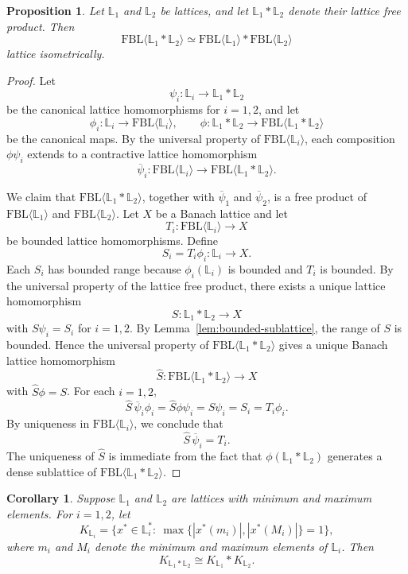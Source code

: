 \documentclass[12pt]{amsart}
\newcommand{\FBL}{\mathrm{FBL}}
\theoremstyle{plain}
\newtheorem{corollary}[theorem]{Corollary}
\newtheorem{proposition}[theorem]{Proposition}
\theoremstyle{definition}
\begin{document}
\begin{proposition}\label{prop:lattice-freeproducts}
Let $\mathbb L_1$ and $\mathbb L_2$ be lattices, and let $\mathbb L_1\ast \mathbb L_2$ denote their lattice free product. Then
\[
\FBL\langle \mathbb L_1\ast \mathbb L_2\rangle
\simeq
\FBL\langle \mathbb L_1\rangle\ast \FBL\langle \mathbb L_2\rangle
\]
lattice isometrically.
\end{proposition}

\begin{proof}
Let
\[
\psi_i:{\mathbb L}_i\to \mathbb L_1\ast \mathbb L_2
\]
be the canonical lattice homomorphisms for $i=1,2$, and let
\[
\phi_i:{\mathbb L}_i\to \FBL\langle \mathbb L_i\rangle,
\qquad
\phi:{\mathbb L}_1\ast \mathbb L_2\to \FBL\langle \mathbb L_1\ast \mathbb L_2\rangle
\]
be the canonical maps. By the universal property of $\FBL\langle \mathbb L_i\rangle$, each composition $\phi\psi_i$ extends to a contractive lattice homomorphism
\[
\overline{\psi}_i:\FBL\langle \mathbb L_i\rangle\to \FBL\langle \mathbb L_1\ast \mathbb L_2\rangle.
\]

We claim that $\FBL\langle \mathbb L_1\ast \mathbb L_2\rangle$, together with $\overline{\psi}_1$ and $\overline{\psi}_2$, is a free product of $\FBL\langle \mathbb L_1\rangle$ and $\FBL\langle \mathbb L_2\rangle$. Let $X$ be a Banach lattice and let
\[
T_i:\FBL\langle \mathbb L_i\rangle\to X
\]
be bounded lattice homomorphisms. Define
\[
S_i=T_i\phi_i:{\mathbb L}_i\to X.
\]
Each $S_i$ has bounded range because $\phi_i(\mathbb L_i)$ is bounded and $T_i$ is bounded. By the universal property of the lattice free product, there exists a unique lattice homomorphism
\[
S:{\mathbb L}_1\ast \mathbb L_2\to X
\]
with $S\psi_i=S_i$ for $i=1,2$. By Lemma~\ref{lem:bounded-sublattice}, the range of $S$ is bounded. Hence the universal property of $\FBL\langle \mathbb L_1\ast \mathbb L_2\rangle$ gives a unique Banach lattice homomorphism
\[
\widehat{S}:\FBL\langle \mathbb L_1\ast \mathbb L_2\rangle\to X
\]
with $\widehat{S}\phi=S$. For each $i=1,2$,
\[
\widehat{S}\,\overline{\psi}_i\phi_i
=
\widehat{S}\phi\psi_i
=
S\psi_i
=
S_i
=
T_i\phi_i.
\]
By uniqueness in $\FBL\langle \mathbb L_i\rangle$, we conclude that
\[
\widehat{S}\,\overline{\psi}_i=T_i.
\]
The uniqueness of $\widehat{S}$ is immediate from the fact that $\phi(\mathbb L_1\ast \mathbb L_2)$ generates a dense sublattice of $\FBL\langle \mathbb L_1\ast \mathbb L_2\rangle$.
\end{proof}

\begin{corollary}\label{cor:lattice-join}
Suppose $\mathbb L_1$ and $\mathbb L_2$ are lattices with minimum and maximum elements. For $i=1,2$, let
\[
K_{\mathbb L_i}
=
\Big\{x^*\in \mathbb L_i^*:\ \max\{|x^*(m_i)|,|x^*(M_i)|\}=1\Big\},
\]
where $m_i$ and $M_i$ denote the minimum and maximum elements of $\mathbb L_i$. Then
\[
K_{\mathbb L_1\ast \mathbb L_2}\cong K_{\mathbb L_1}\ast K_{\mathbb L_2}.
\]
\end{corollary}
\end{document}
